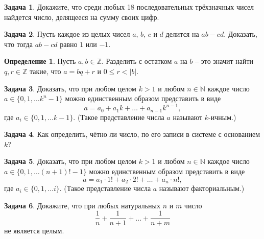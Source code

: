 \documentclass[12pt, fleqn]{extarticle}
\newcommand{\nat}{\mathbb{N}}
\newcommand{\integer}{\mathbb{Z}}
\theoremstyle{definition}
\newtheorem{definition}{Определение}
\newtheorem{problem}{Задача}
\theoremstyle{remark}
\begin{document}
\begin{problem}
Докажите, что среди любых 18 последовательных трёхзначных чисел
найдется число, делящееся на сумму своих цифр.
\end{problem}


\begin{problem}
Пусть каждое из целых чисел $a$, $b$, $c$ и $d$ делится на $ab-cd$. 
Доказать, что тогда $ab-cd$ равно $1$ или $-1$.
\end{problem}

\begin{definition}
Пусть $a, b \in \integer$.
Разделить с остатком $a$ на $b$ -- это значит найти $q, r \in \integer$
такие, что $a = bq + r$ и $0 \leqslant r < |b|$.
\end{definition}

\begin{problem}
Доказать, что при любом целом $k > 1$ и любом $n \in \nat$
каждое число $a \in \{0, 1, \ldots k^{n} - 1\}$
можно единственным образом представить в виде
$$a = a_{0} + a_{1}k + \ldots + a_{n-1}k^{n-1},$$
где  $a_{i} \in \{0, 1, \ldots k - 1\}$. 
(Такое представление числа $a$ называют $k$-ичным.)
\end{problem}

\begin{problem}
Как определить, чётно ли число, по его записи в системе с
основанием $k$?
\end{problem}

\begin{problem}
Доказать, что при любом целом $k > 1$ и любом $n \in \nat$
каждое число $a \in \{0, 1, \ldots (n+1)! - 1\}$
можно единственным образом представить в виде
$$a = a_{1} \cdot 1! + a_{2} \cdot 2! + \ldots + a_{n} \cdot n!,$$
где  $a_{i} \in \{0, 1, \ldots i\}$. 
(Такое представление числа $a$ называют факториальным.)
\end{problem}


\begin{problem}
Докажите, что при любых натуральных $n$ и $m$ число 
$$\frac{1}{n} + \frac{1}{n + 1} + \ldots + \frac{1}{n + m}$$
не является целым.
\end{problem}
\end{document}
